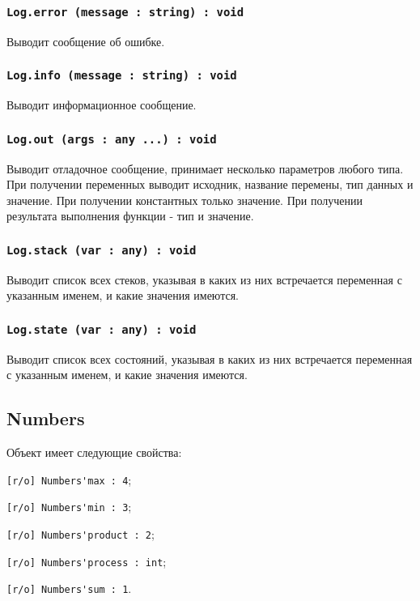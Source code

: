 \subsubsection{\lstinline|Log.error (message : string) : void|}

Выводит сообщение об ошибке.

\subsubsection{\lstinline|Log.info (message : string) : void|}

Выводит информационное сообщение.

\subsubsection{\lstinline|Log.out (args : any ...) : void|}

Выводит отладочное сообщение, принимает несколько параметров любого типа. При получении переменных выводит исходник, название перемены, тип данных и значение. При получении константных только значение. При получении результата выполнения функции - тип и значение. 

\subsubsection{\lstinline|Log.stack (var : any) : void|}

Выводит список всех стеков, указывая в каких из них встречается переменная с указанным именем, и какие значения имеются.

\subsubsection{\lstinline|Log.state (var : any) : void|}

Выводит список всех состояний, указывая в каких из них встречается переменная с указанным именем, и какие значения имеются.

\subsection{{\color{orange} Numbers}}

Объект \numbers{} имеет следующие свойства:
\begin{icItems}
	\item \lstinline|[r/o] Numbers'max : 4|;
	\item \lstinline|[r/o] Numbers'min : 3|;
	\item \lstinline|[r/o] Numbers'product : 2|;
	\item \lstinline|[r/o] Numbers'process : int|;
	\item \lstinline|[r/o] Numbers'sum : 1|.
\end{icItems}

